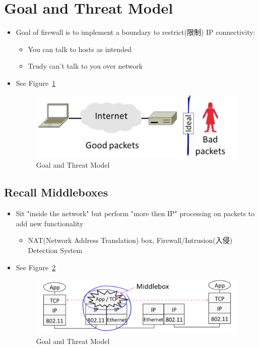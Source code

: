 \documentclass[12pt]{ctexart}   %
\begin{document}
	\section{Goal and Threat Model}
	\begin{itemize}
		\item Goal of firewall is to implement a boundary to restrict(限制) IP connectivity:
		\begin{itemize}
			\item You can talk to hosts as intended
			\item Trudy can't talk to you over network
		\end{itemize}
		\item See Figure~\ref{fig:10-7-2}
		  
		\begin{figure}[h!] %
		\centering
		\includegraphics[scale=0.7]{images/10-7-2}
		\caption{Goal and Threat Model}
		\label{fig:10-7-2}
		\end{figure}
	\end{itemize}

	\subsection{Recall Middleboxes}
	\begin{itemize}
		\item Sit "inside the network" but perform "more then IP" processing on packets to add new functionality
		\begin{itemize}
			\item NAT(Network Address Translation) box, Firewall/Intrusion(入侵) Detection System
		\end{itemize}
		\item See Figure~\ref{fig:10-7-3}
		  
		\begin{figure}[h!] %
		\centering
		\includegraphics[scale=0.7]{images/10-7-3}
		\caption{Goal and Threat Model}
		\label{fig:10-7-3}
		\end{figure}
	\end{itemize}
\end{document}
